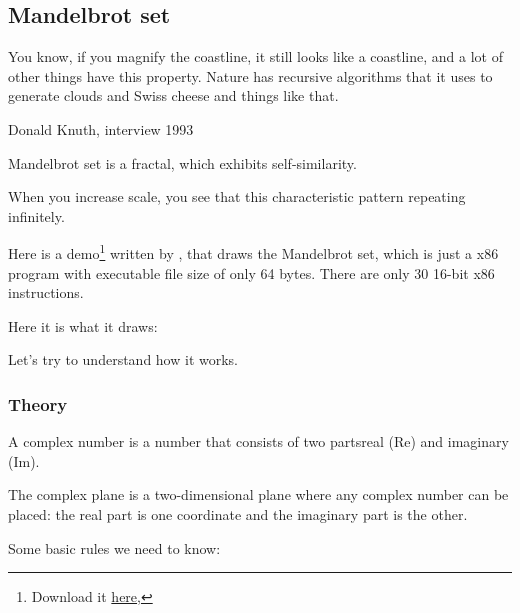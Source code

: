 ﻿\clearpage
\subsection{Mandelbrot set}
\label{Mandelbrot_demo}

\epigraph{You know, if you magnify the coastline, it still looks like
a coastline, and a lot of other things have this property. Nature has
recursive algorithms that it uses to generate clouds and Swiss cheese
and things like that.}
{Donald Knuth, interview 1993}

Mandelbrot set is a fractal, which exhibits self-similarity.

When you increase scale, you see that this characteristic pattern repeating infinitely.

Here is a demo\footnote{Download it \href{http://go.yurichev.com/17306}
{here},} 
written by  , 
that draws 
the Mandelbrot set, which is just a x86 program with executable file size of only 64 bytes.
There are only 30 16-bit x86 instructions.

Here it is what it draws:

\begin{figure}[H]
\centering
{}
\end{figure}

Let's try to understand how it works.

\clearpage
\subsubsection{Theory}



A complex number is a number that consists of two parts\EMDASH{}real (Re) and imaginary (Im).


The complex plane is a two-dimensional plane where any complex number can be placed: the real part is one coordinate
and the imaginary part is the other.

Some basic rules we need to know:

